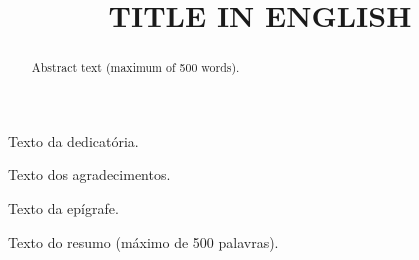 \documentclass[oneside]{normas-utf-tex} %
\title{\MakeUppercase{Title in English}} %
\begin{document}

\capa %
\folhaderosto %

\begin{dedicatoria}
Texto da dedicatória.
\end{dedicatoria}

\begin{agradecimentos}
Texto dos agradecimentos.
\end{agradecimentos}

\begin{epigrafe}
Texto da epígrafe.
\end{epigrafe}

\begin{resumo}
Texto do resumo (máximo de 500 palavras).
\end{resumo}

\begin{abstract}
Abstract text (maximum of 500 words).
\end{abstract}

\listadefiguras %
\listadetabelas %
\listadesiglas %
\listadesimbolos %

\sumario %


%
%
%
%


 
 


 
 

\end{document}

